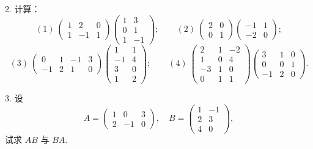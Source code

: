 \documentclass[UTF8, 12pt, fontset=fandol, oneside]{ctexart}
\begin{document}
2. 计算：
\[
(1)\ \left(\begin{array}{ccc}
1 & 2 & 0\\
1 & -1 & 1
\end{array}\right)
\left(\begin{array}{cc}
1 & 3\\
0 & 1\\
1 & -1
\end{array}\right);
\qquad
(2)\ \left(\begin{array}{cc}
2 & 0\\
0 & 1
\end{array}\right)
\left(\begin{array}{cc}
-1 & 1\\
-2 & 0
\end{array}\right);
\]
\[
(3)\ \left(\begin{array}{cccc}
0 & 1 & -1 & 3\\
-1 & 2 & 1 & 0
\end{array}\right)
\left(\begin{array}{cc}
1 & 1\\
-1 & 4\\
3 & 0\\
1 & 2
\end{array}\right);
\qquad
(4)\ \left(\begin{array}{ccc}
2 & 1 & -2\\
1 & 0 & 4\\
-3 & 1 & 0\\
0 & 1 & 1
\end{array}\right)
\left(\begin{array}{ccc}
3 & 1 & 0\\
0 & 0 & 1\\
-1 & 2 & 0
\end{array}\right).
\]

3. 设
\[
A=\left(\begin{array}{ccc}
1 & 0 & 3\\
2 & -1 & 0
\end{array}\right),\quad
B=\left(\begin{array}{cc}
1 & -1\\
2 & 3\\
4 & 0
\end{array}\right),
\]
试求 $AB$ 与 $BA$.
\end{document}
